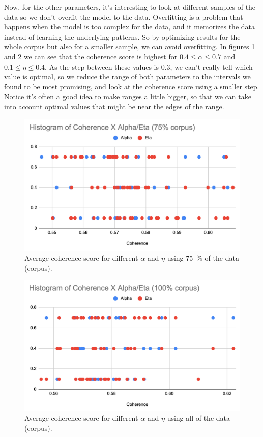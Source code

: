 \documentclass[conference, onecolumn]{IEEEtran}
\begin{document}
Now, for the other parameters, it's interesting to look at different samples of
the data so we don't overfit the model to the data.
Overfitting is a problem that happens when the model is too complex for the
data, and it memorizes the data instead of learning the underlying patterns.
So by optimizing results for the whole corpus but also for a smaller sample, we
can avoid overfitting.
In figures \cref{fig:75p-coherenceXalpha-eta} and
\cref{fig:100p-coherenceXalpha-eta} we can see that the coherence score is
highest for $0.4 \leqslant \alpha \leqslant 0.7$ and
$0.1 \leqslant \eta \leqslant 0.4$.
As the step between these values is $0.3$, we can't really tell which value is
optimal, so we reduce the range of both parameters to the intervals we found to
be most promising, and look at the coherence score using a smaller step.
Notice it's often a good idea to make ranges a little bigger, so that we can
take into account optimal values that might be near the edges of the range.

\begin{figure}[H]
    \centering
    \includegraphics[width=0.7\linewidth]{75p-coherenceXalpha-eta.png}
    \caption{Average coherence score for different $\alpha$ and $\eta$ using
        \qty{75}{\percent} of the data (corpus).}
    \label{fig:75p-coherenceXalpha-eta}
\end{figure}

\begin{figure}[H]
    \centering
    \includegraphics[width=0.7\linewidth]{100p-coherenceXalpha-eta.png}
    \caption{Average coherence score for different $\alpha$ and $\eta$ using
        all of the data (corpus).}
    \label{fig:100p-coherenceXalpha-eta}
\end{figure}
\end{document}
